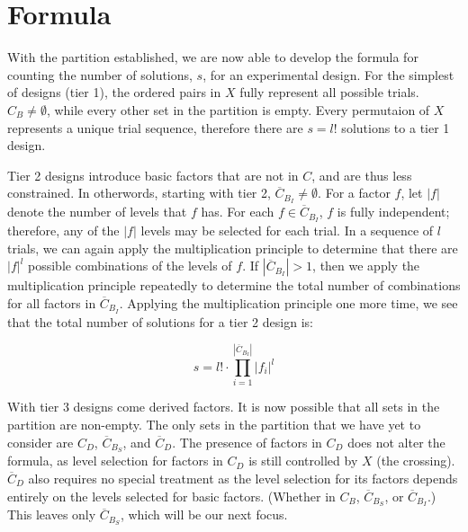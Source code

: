 \section{Formula}

With the partition established, we are now able to develop the formula for counting the number of solutions, $s$, for an experimental design. For the simplest of designs (tier 1), the ordered pairs in $X$ fully represent all possible trials. $C_B \neq \emptyset$, while every other set in the partition is empty. Every permutaion of $X$ represents a unique trial sequence, therefore there are $s = l!$ solutions to a tier 1 design.

Tier 2 designs introduce basic factors that are not in $C$, and are thus less constrained. In otherwords, starting with tier 2, $\overline{C}_{B_I} \neq \emptyset$. For a factor $f$, let $|f|$ denote the number of levels that $f$ has. For each $f \in \overline{C}_{B_I}$, $f$ is fully independent; therefore, any of the $|f|$ levels may be selected for each trial. In a sequence of $l$ trials, we can again apply the multiplication principle to determine that there are $|f|^l$ possible combinations of the levels of $f$. If $|\overline{C}_{B_I}| > 1$, then we apply the multiplication principle repeatedly to determine the total number of combinations for all factors in $\overline{C}_{B_I}$. Applying the multiplication principle one more time, we see that the total number of solutions for a tier 2 design is:

\[
s = l! \cdot \prod_{i=1}^{|\overline{C}_{B_I}|} |f_i|^l
\]



With tier 3 designs come derived factors. It is now possible that all sets in the partition are non-empty. The only sets in the partition that we have yet to consider are $C_D$, $\overline{C}_{B_S}$, and $\overline{C}_D$. The presence of factors in $C_D$ does not alter the formula, as level selection for factors in $C_D$ is still controlled by $X$ (the crossing). $\overline{C}_D$ also requires no special treatment as the level selection for its factors depends entirely on the levels selected for basic factors. (Whether in $C_B$, $\overline{C}_{B_S}$, or $\overline{C}_{B_I}$.) This leaves only $\overline{C}_{B_S}$, which will be our next focus.

